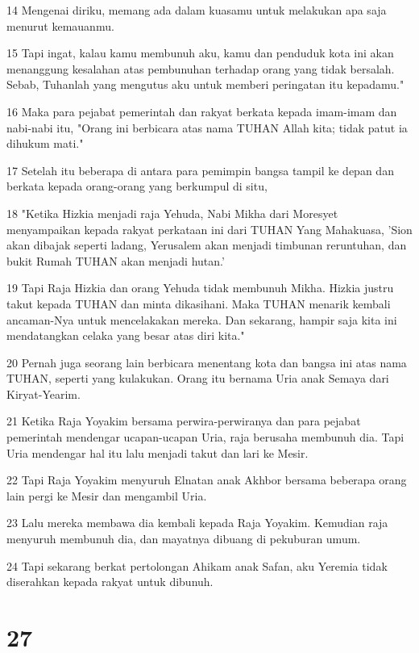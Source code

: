 \par 14 Mengenai diriku, memang ada dalam kuasamu untuk melakukan apa saja menurut kemauanmu.
\par 15 Tapi ingat, kalau kamu membunuh aku, kamu dan penduduk kota ini akan menanggung kesalahan atas pembunuhan terhadap orang yang tidak bersalah. Sebab, Tuhanlah yang mengutus aku untuk memberi peringatan itu kepadamu."
\par 16 Maka para pejabat pemerintah dan rakyat berkata kepada imam-imam dan nabi-nabi itu, "Orang ini berbicara atas nama TUHAN Allah kita; tidak patut ia dihukum mati."
\par 17 Setelah itu beberapa di antara para pemimpin bangsa tampil ke depan dan berkata kepada orang-orang yang berkumpul di situ,
\par 18 "Ketika Hizkia menjadi raja Yehuda, Nabi Mikha dari Moresyet menyampaikan kepada rakyat perkataan ini dari TUHAN Yang Mahakuasa, 'Sion akan dibajak seperti ladang, Yerusalem akan menjadi timbunan reruntuhan, dan bukit Rumah TUHAN akan menjadi hutan.'
\par 19 Tapi Raja Hizkia dan orang Yehuda tidak membunuh Mikha. Hizkia justru takut kepada TUHAN dan minta dikasihani. Maka TUHAN menarik kembali ancaman-Nya untuk mencelakakan mereka. Dan sekarang, hampir saja kita ini mendatangkan celaka yang besar atas diri kita."
\par 20 Pernah juga seorang lain berbicara menentang kota dan bangsa ini atas nama TUHAN, seperti yang kulakukan. Orang itu bernama Uria anak Semaya dari Kiryat-Yearim.
\par 21 Ketika Raja Yoyakim bersama perwira-perwiranya dan para pejabat pemerintah mendengar ucapan-ucapan Uria, raja berusaha membunuh dia. Tapi Uria mendengar hal itu lalu menjadi takut dan lari ke Mesir.
\par 22 Tapi Raja Yoyakim menyuruh Elnatan anak Akhbor bersama beberapa orang lain pergi ke Mesir dan mengambil Uria.
\par 23 Lalu mereka membawa dia kembali kepada Raja Yoyakim. Kemudian raja menyuruh membunuh dia, dan mayatnya dibuang di pekuburan umum.
\par 24 Tapi sekarang berkat pertolongan Ahikam anak Safan, aku Yeremia tidak diserahkan kepada rakyat untuk dibunuh.

\chapter{27}

